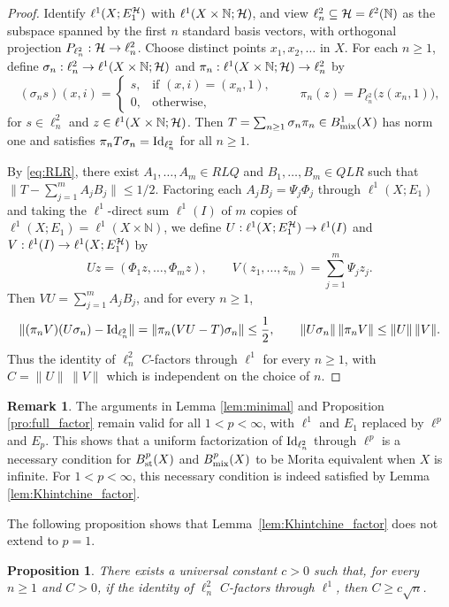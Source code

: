 \documentclass[11pt,reqno]{amsart}
\theoremstyle{definition}
\newtheorem{Rem}[Def]{Remark}
\theoremstyle{plain}
\newtheorem{Pro}[Def]{Proposition}
\def\IN{\mathbb N}\def\IR{\mathbb R}\def\IE{\mathbb E}\def\IC{\mathbb C}\def\IL{\mathbb L}\def\IQ{\mathbb Q}\def\IA{\mathbb A}\def\IZ{\mathbb Z}
\begin{document}
\begin{proof}
Identify $\ell^1(X;E_1^{\mathcal H})$ with $\ell^1(X\times\IN;\H)$, and view $\ell^2_n\subseteq\H=\ell^2(\IN)$ as the subspace spanned by the first $n$ standard basis vectors, with orthogonal projection $P_{\ell^2_n}:\mathcal H\to\ell^2_n$. Choose distinct points $x_1,x_2,\dots$ in $X$. For each $n\ge1$, define $\sigma_n:\ell^2_n\to\ell^1(X\times\IN;\H)$ and $\pi_n:\ell^1(X\times\IN;\H)\to\ell^2_n$ by
\[
(\sigma_n s)(x,i)=
\begin{cases}
s, & \text{if }(x,i)=(x_n,1),\\
0, & \text{otherwise},
\end{cases}
\qquad
\pi_n(z)=P_{\ell^2_n}\big(z(x_n,1)\big),
\]
for $s\in\ell^2_n$ and $z\in\ell^1(X\times\IN;\H)$. Then $T=\sum_{n\ge1}\sigma_n\pi_n\in B^1_{\textup{mix}}(X)$ has norm one and satisfies $\pi_nT\sigma_n=\textup{Id}_{\ell^2_n}$ for all $n\ge1$.

By \eqref{eq:RLR}, there exist $A_1,\dots,A_m\in RLQ$ and $B_1,\dots,B_m\in QLR$ such that $\|T-\sum_{j=1}^mA_jB_j\|\le 1/2$. Factoring each $A_jB_j=\Psi_j\Phi_j$ through $\ell^1(X;E_1)$ and taking the $\ell^1$-direct sum $\ell^1(I)$ of $m$ copies of $\ell^1(X;E_1)=\ell^1(X\times\IN)$, we define $U:\ell^1(X;E_1^{\mathcal H})\to\ell^1(I)$ and $V:\ell^1(I)\to\ell^1(X;E_1^{\mathcal H})$ by
\[
Uz=(\Phi_1z,\dots,\Phi_mz),\qquad V(z_1,\dots,z_m)=\sum_{j=1}^m\Psi_jz_j.
\]
Then $VU=\sum_{j=1}^mA_jB_j$, and for every $n\ge1$,
\[
\|(\pi_nV)(U\sigma_n)-\textup{Id}_{\ell^2_n}\|=\|\pi_n(VU-T)\sigma_n\|\le\frac12,\qquad\|U\sigma_n\|\,\|\pi_nV\|\le\|U\|\,\|V\|.
\]
Thus the identity of $\ell^2_n$ $C$-factors through $\ell^1$ for every $n\ge1$, with $C=\|U\|\,\|V\|$ which is independent on the choice of $n$.
\end{proof}

\begin{Rem}\label{rem:full_factor_p}
The arguments in Lemma \ref{lem:minimal} and Proposition \ref{pro:full_factor} remain valid for all $1<p<\infty$, with $\ell^1$ and $E_1$ replaced by $\ell^p$ and $E_p$. This shows that a uniform factorization of $\textup{Id}_{\ell^2_n}$ through $\ell^p$ is a necessary condition for $B^p_{\textup{st}}(X)$ and $B^p_{\textup{mix}}(X)$ to be Morita equivalent when $X$ is infinite. For $1<p<\infty$, this necessary condition is indeed satisfied by Lemma \ref{lem:Khintchine_factor}.
\end{Rem}

The following proposition shows that Lemma~\ref{lem:Khintchine_factor} does not extend to $p=1$.

\begin{Pro}\label{pro:no_factor}
There exists a universal constant $c>0$ such that, for every $n\ge1$ and $C>0$, if the identity of $\ell^2_n$ $C$-factors through $\ell^1$, then $C\ge c\sqrt n$.
\end{Pro}
\end{document}
